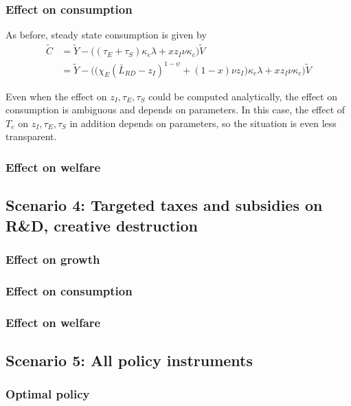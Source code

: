 \documentclass[11pt,english]{article}
\theoremstyle{remark}
\begin{document}
\subsubsection{Effect on consumption}

As before, steady state consumption is given by
\begin{align}
\tilde{C} &= \tilde{Y} - \Big( (\tau_E  + \tau_S)\kappa_e \lambda + x z_I \nu \kappa_c \Big) \tilde{V} \\
&= \tilde{Y} - \Big( \big( \chi_E (\bar{L}_{RD} - z_I)^{1-\psi} + (1-x) \nu z_I \big) \kappa_e \lambda + x z_I \nu \kappa_c \Big) \tilde{V}  \label{cs:scen3:consumption_eq}
\end{align}

Even when the effect on $z_I,\tau_E,\tau_S$ could be computed analytically, the effect on consumption is ambiguous and depends on parameters. In this case, the effect of $T_e$ on $z_I,\tau_E,\tau_S$ in addition depends on parameters, so the situation is even less transparent. 

\subsubsection{Effect on welfare}



\subsection{Scenario 4: Targeted taxes and subsidies on R\&D, creative destruction}

\subsubsection{Effect on growth}

\subsubsection{Effect on consumption}

\subsubsection{Effect on welfare}

\subsection{Scenario 5: All policy instruments}

\subsubsection{Optimal policy}
\end{document}
